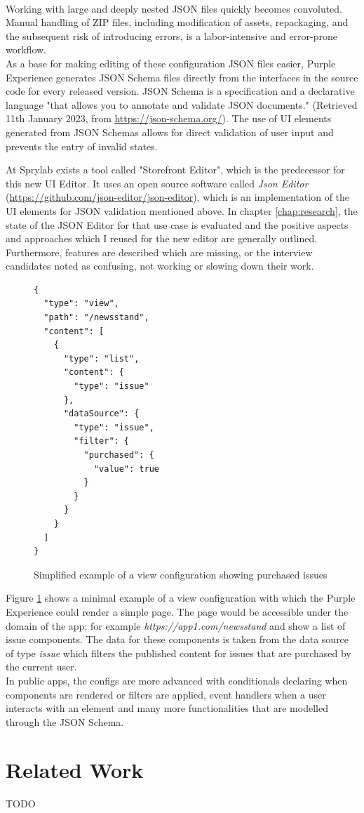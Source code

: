 \\
Working with large and deeply nested JSON files quickly becomes convoluted.
Manual handling of ZIP files, including modification of assets, repackaging, and the subsequent risk of introducing errors, is a labor-intensive and error-prone workflow.
\\
As a base for making editing of these configuration JSON files easier, Purple Experience generates JSON Schema files directly from the interfaces in the source code for every released version.
JSON Schema is a specification and a declarative language "that allows you to annotate and validate JSON documents." (Retrieved 11th January 2023, from \url{https://json-schema.org/}).
The use of UI elements generated from JSON Schemas allows for direct validation of user input and prevents the entry of invalid states.

At Sprylab exists a tool called "Storefront Editor", which is the predecessor for this new UI Editor.
It uses an open source software called \textit{Json Editor} (\url{https://github.com/json-editor/json-editor}), which is an implementation of the UI elements for JSON validation mentioned above.
In chapter \ref{chap:research}, the state of the JSON Editor for that use case is evaluated and the positive aspects and approaches which I reused for the new editor are generally outlined.
Furthermore, features are described which are missing, or the interview candidates noted as confusing, not working or slowing down their work.

\begin{figure}[h]
  \lstset{language=json,basicstyle=\footnotesize,numbers=left,showstringspaces=false,frame=single}
  \begin{lstlisting}
{
  "type": "view",
  "path": "/newsstand",
  "content": [
    {
      "type": "list",
      "content": {
        "type": "issue"
      },
      "dataSource": {
        "type": "issue",
        "filter": {
          "purchased": {
            "value": true
          }
        }
      }
    }
  ]
}
  \end{lstlisting}
  \caption{Simplified example of a view configuration showing purchased issues}
  \label{fig:viewexample}
\end{figure}

Figure \ref{fig:viewexample} shows a minimal example of a view configuration with which the Purple Experience could render a simple page.
The page would be accessible under the domain of the app; for example \textit{https://app1.com/newsstand} and show a list of issue components.
The data for these components is taken from the data source of type \textit{issue} which filters the published content for issues that are purchased by the current user. 
\\
In public apps, the configs are more advanced with conditionals declaring when components are rendered or filters are applied, event handlers when a user interacts with an element and many more functionalities that are modelled through the JSON Schema.


\section{Related Work}

TODO